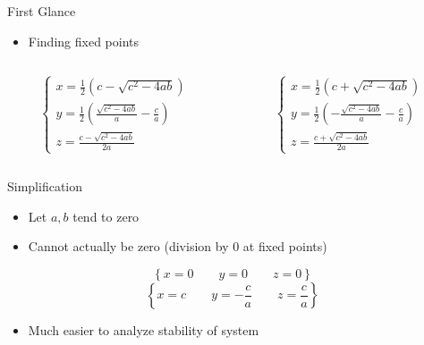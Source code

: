\documentclass{beamer}
\begin{document}
\begin{frame}{First Glance}
	\begin{itemize}
		\item Finding fixed points
	    \pause
	\end{itemize}
	\begin{center}
	\end{center}
	\pause
	\begin{columns}[T]
		\begin{column}{0.48\textwidth}
			\[
				\begin{cases}
					x=\frac{1}{2}\left(c-\sqrt{c^{2}-4ab}\right)                     \\
					y=\frac{1}{2}\left(\frac{\sqrt{c^{2}-4ab}}{a}-\frac{c}{a}\right) \\
					z=\frac{c-\sqrt{c^{2}-4ab}}{2a}
				\end{cases}
			\]
		\end{column}
		\begin{column}{0.48\textwidth}
			\[
				\begin{cases}
					x=\frac{1}{2}\left(c+\sqrt{c^{2}-4ab}\right)                      \\
					y=\frac{1}{2}\left(-\frac{\sqrt{c^{2}-4ab}}{a}-\frac{c}{a}\right) \\
					z=\frac{c+\sqrt{c^{2}-4ab}}{2a}
				\end{cases}
			\]
		\end{column}
	\end{columns}
\end{frame}

\begin{frame}{Simplification}
    \begin{itemize}
        \item Let $a,b$ tend to zero
        \pause
        \item Cannot actually be zero (division by 0 at fixed points)
        \pause
    \end{itemize}
    \[\left\{x = 0\qquad y = 0\qquad z = 0\right\}\]
    \pause
    \[\left\{x = c\qquad y = -\frac{c}{a}\qquad z = \frac{c}{a}\right\}\]
    \pause
    \begin{itemize}
        \item Much easier to analyze stability of system
    \end{itemize}
\end{frame}
\end{document}

